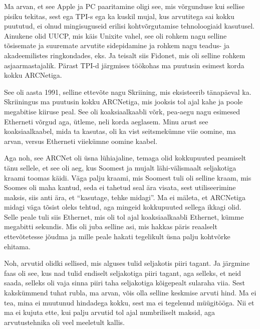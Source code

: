 Ma arvan, et see Apple ja PC paaritamine oligi see, mis  võrgunduse kui sellise 
pisiku tekitas, sest ega TPI-s ega ka kuskil mujal, kus arvutitega sai kokku 
puututud, ei olnud mingisuguseid erilisi kohtvõrgutamise tehnoloogiaid 
kasutusel. Ainukene olid UUCP, mis käis Unixite vahel, see oli rohkem nagu 
selline tõsisemate ja suuremate arvutite sidepidamine  ja rohkem nagu teadus- 
ja akadeemilistes ringkondades, eks. Ja teisalt siis Fidonet, mis oli selline 
rohkem asjaarmastajalik. Pärast TPI-d järgmises töökohas ma  puutusin esimest 
korda kokku ARCNetiga.


See oli  aasta 1991, selline ettevõte nagu Skriining, mis 
eksisteerib tänapäeval ka. Skriiningus ma puutusin kokku ARCNetiga, mis jooksis 
tol ajal kahe ja poole megabitise kiiruse peal. See oli koaksiaalkaabli võrk, 
pea-aegu nagu esimesed Etherneti võrgud aga, ütleme, neli korda aeglasem. Minu 
arust see koaksiaalkaabel, mida ta kasutas, oli ka vist seitsmekümne viie 
oomine, ma arvan, versus Etherneti viiekümne oomine kaabel. 

Aga noh, see ARCNet oli  üsna lühiajaline, temaga olid kokkupuuted peamiselt  
tänu sellele, et see oli  aeg, kus Soomest ja mujalt lähi-välismaalt 
seljakotiga kraami toomas käidi. Väga palju kraami, mis Soomest tuli oli 
selline kraam, mis Soomes oli maha kantud, seda ei tahetud seal ära visata, 
sest  utiliseerimine maksis, siis anti ära, et \enquote{kasutage, tehke 
midagi}. Ma ei mäleta, et ARCNetiga midagi väga tõsist oleks tehtud, aga 
mingeid kokkupuuted sellega ikkagi olid. Selle peale tuli siis Ethernet, mis 
oli tol ajal koaksiaalkaabli Ethernet, kümme megabitti sekundis. Mis oli juba 
selline asi, mis hakkas päris reaalselt ettevõtetesse jõudma ja mille peale 
hakati tegelikult üsna palju  kohtvõrke ehitama.


Noh, arvutid olidki sellised, mis alguses tulid seljakotis piiri tagant. Ja 
järgmine faas oli see, kus  nad tulid endiselt seljakotiga piiri tagant, aga 
selleks, et neid saada, selleks oli vaja sinna piiri taha seljakotiga 
kõigepealt sularaha viia. Sest kakskümmend tuhat rubla, ma arvan, võis olla  
selline keskmise arvuti hind. Ma ei tea, mina ei muutunud hindadega kokku, sest 
ma ei tegelenud müügitööga. Nii et ma ei kujuta ette, kui palju  arvutid tol 
ajal  numbriliselt maksid, aga arvutustehnika oli veel meeletult kallis.


